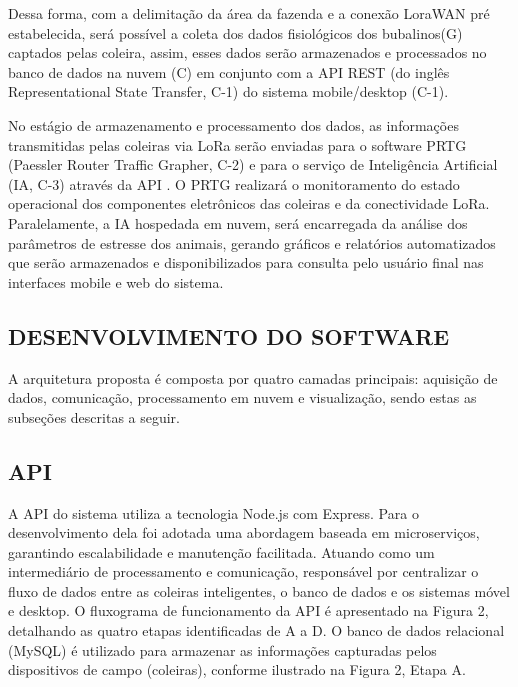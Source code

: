 \documentclass[11pt,a4paper]{article}
\begin{document}
Dessa forma, com a delimitação da área da fazenda e a conexão LoraWAN pré estabelecida,
será possível a coleta dos dados fisiológicos dos bubalinos(G) captados pelas coleira, assim, esses
dados serão armazenados e processados no banco de dados na nuvem (C) em conjunto com a
API REST (do inglês Representational State Transfer, C-1) do sistema mobile/desktop (C-1).

No estágio de armazenamento e processamento dos dados, as informações transmitidas pelas
coleiras via LoRa serão enviadas para o software PRTG (Paessler Router Traffic Grapher, C-2)
e para o serviço de Inteligência Artificial (IA, C-3) através da API . O PRTG realizará o monitoramento do estado operacional dos componentes eletrônicos das coleiras e da conectividade
LoRa. Paralelamente, a IA hospedada em nuvem, será encarregada da análise dos parâmetros
de estresse dos animais, gerando gráficos e relatórios automatizados que serão armazenados e
disponibilizados para consulta pelo usuário final nas interfaces mobile e web do sistema.

\subsection{DESENVOLVIMENTO DO SOFTWARE}

A arquitetura proposta é composta por quatro camadas principais: aquisição de dados, comunicação, processamento em nuvem e visualização, sendo estas as subseções descritas a seguir.

\subsection*{API}

A API do sistema utiliza a tecnologia Node.js com Express. Para o desenvolvimento dela foi
adotada uma abordagem baseada em microserviços, garantindo escalabilidade e manutenção
facilitada. Atuando como um intermediário de processamento e comunicação, responsável por
centralizar o fluxo de dados entre as coleiras inteligentes, o banco de dados e os sistemas móvel
e desktop. O fluxograma de funcionamento da API é apresentado na Figura 2, detalhando as
quatro etapas identificadas de A a D. O banco de dados relacional (MySQL) é utilizado para
armazenar as informações capturadas pelos dispositivos de campo (coleiras), conforme ilustrado
na Figura 2, Etapa A.
\end{document}
